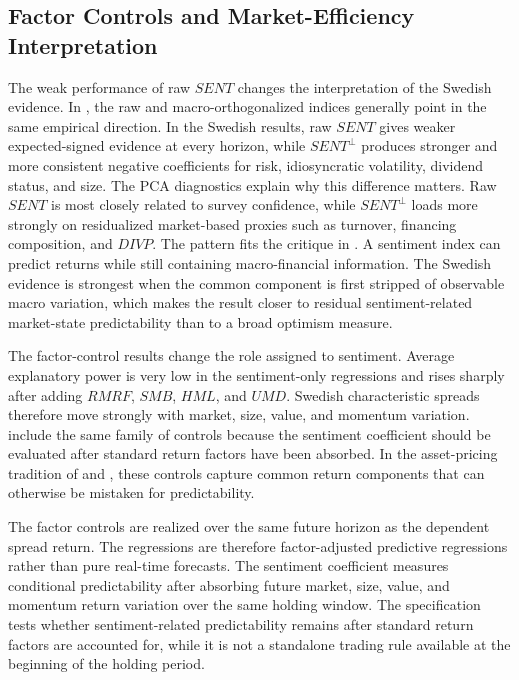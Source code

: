 \documentclass[11pt]{article}
\newcommand{\var}[1]{\ensuremath{#1}}
\begin{document}
\subsection{Factor Controls and Market-Efficiency Interpretation}
The weak performance of raw \var{SENT} changes the interpretation of the Swedish evidence. In \citet{baker2006sentiment}, the raw and macro-orthogonalized indices generally point in the same empirical direction. In the Swedish results, raw \var{SENT} gives weaker expected-signed evidence at every horizon, while \var{SENT^{\perp}} produces stronger and more consistent negative coefficients for risk, idiosyncratic volatility, dividend status, and size. The PCA diagnostics explain why this difference matters. Raw \var{SENT} is most closely related to survey confidence, while \var{SENT^{\perp}} loads more strongly on residualized market-based proxies such as turnover, financing composition, and \var{DIVP}. The pattern fits the critique in \citet{sibley2012sentimental}. A sentiment index can predict returns while still containing macro-financial information. The Swedish evidence is strongest when the common component is first stripped of observable macro variation, which makes the result closer to residual sentiment-related market-state predictability than to a broad optimism measure.

The factor-control results change the role assigned to sentiment. Average explanatory power is very low in the sentiment-only regressions and rises sharply after adding \var{RMRF}, \var{SMB}, \var{HML}, and \var{UMD}. Swedish characteristic spreads therefore move strongly with market, size, value, and momentum variation. \citet{baker2006sentiment} include the same family of controls because the sentiment coefficient should be evaluated after standard return factors have been absorbed. In the asset-pricing tradition of \citet{fama1993common} and \citet{carhart1997persistence}, these controls capture common return components that can otherwise be mistaken for predictability.

The factor controls are realized over the same future horizon as the dependent spread return. The regressions are therefore factor-adjusted predictive regressions rather than pure real-time forecasts. The sentiment coefficient measures conditional predictability after absorbing future market, size, value, and momentum return variation over the same holding window. The specification tests whether sentiment-related predictability remains after standard return factors are accounted for, while it is not a standalone trading rule available at the beginning of the holding period.
\end{document}
